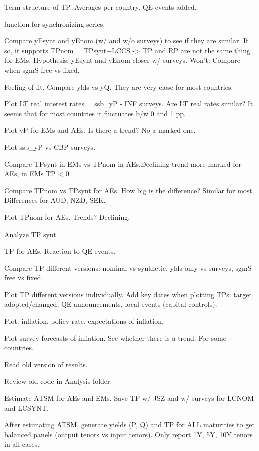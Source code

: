 \documentclass[12pt]{article}
\newcommand{\cmark}{\ding{51}}
\newcommand{\done}{\rlap{$\square$}{\raisebox{2pt}{\large\hspace{1pt}\cmark}}%
	\hspace{-2.5pt}}
\begin{document}
\begin{todolist}
	\item[\done] Term structure of TP. Averages per country. QE events added.
	\item[\done] function for synchronizing series.
	\item[\done] Compare yEsynt and yEnom (w/ and w/o surveys) to see if they are similar. If so, it supports TPnom = TPsynt+LCCS -> TP and RP are not the same thing for EMs. Hypothesis: yEsynt and yEnom  closer w/ surveys. Won't: Compare when sgmS free vs fixed.
	\item[\done] Feeling of fit. Compare ylds vs yQ. They are very close for most countries.
	\item[\done] Plot LT real interest rates = ssb_yP - INF surveys. Are LT real rates similar? It seems that for most countries it fluctuates b/w 0 and 1 pp.
	\item[\done] Plot yP for EMs and AEs. Is there a trend? No a marked one.
	\item[\done] Plot ssb_yP vs CBP surveys. 
	\item[\done] Compare TPsynt in EMs vs TPnom in AEs.Declining trend more marked for AEs, in EMs TP < 0.
	\item[\done] Compare TPnom vs TPsynt for AEs. How big is the difference? Similar for most. Differences for AUD, NZD, SEK.
	\item[\done] Plot TPnom for AEs. Trends? Declining.
	\item[\done] Analyze TP synt.
	\item[\done] TP for AEs. Reaction to QE events.
	\item[\done] Compare TP different versions: nominal vs synthetic, ylds only vs surveys, sgmS free vs fixed. 
	\item[\done] Plot TP different versions individually. Add key dates when plotting TPs: target adopted/changed, QE announcements, local events (capital controls). 
	\item[\done] Plot: inflation, policy rate, expectations of inflation.
	\item[\done] Plot survey forecasts of inflation. See whether there is a trend. For some countries.
	\item[\done] Read old version of results.
	\item[\done] Review old code in Analysis folder.	
	\item[\done] Estimate ATSM for AEs and EMs. Save TP w/ JSZ and w/ surveys for LCNOM and LCSYNT.
	\item[\done] After estimating ATSM, generate yields (P, Q) and TP for ALL maturities to get balanced panels (output tenors vs input tenors). Only report 1Y, 5Y, 10Y tenors in all cases.

\end{todolist}
\end{document}
